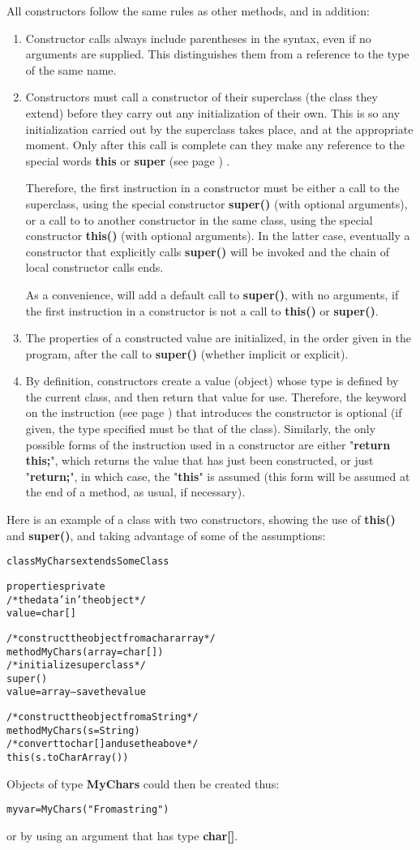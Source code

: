 All constructors follow the same rules as other methods, and in
addition:
\begin{enumerate}
\item Constructor calls always include parentheses in the syntax, even
if no arguments are supplied.  This distinguishes them from a reference
to the type of the same name.
\item Constructors must call a constructor of their superclass (the class
they extend) before they carry out any initialization of their own.
This is so any initialization carried out by the superclass takes
place, and at the appropriate moment.
Only after this call is complete can they make any reference to the
special words  \textbf{this} or \textbf{super} (see page \pageref{refspecial}) .
 
Therefore, the first instruction in a constructor must be either a call
to the superclass, using the special constructor \textbf{super()}
(with optional arguments), or a call to to another constructor in the
same class, using the special constructor \textbf{this()} (with
optional arguments).
In the latter case, eventually a constructor that explicitly
calls \textbf{super()} will be invoked and the chain of local
constructor calls ends.
 
As a convenience, \nr{} will add a default call to \textbf{super()},
with no arguments, if the first instruction in a constructor is not a
call to \textbf{this()} or \textbf{super()}.
\item 
The properties of a constructed value are initialized, in the order
given in the program, after the call to \textbf{super()} (whether
implicit or explicit).
\item 
By definition, constructors create a value (object) whose type is
defined by the current class, and then return that value for use.
Therefore, the  keyword on the
  instruction (see page \pageref{refmethod})  that introduces the
constructor is optional (if given, the type specified must be that of
the class).
Similarly, the only possible forms of the  instruction
used in a constructor are either "\textbf{return this;}", which
returns the value that has just been constructed, or just
"\textbf{return;}", in which case, the "\textbf{this}" is
assumed (this form will be assumed at the end of a method, as usual, if
necessary).
\end{enumerate}
 
Here is an example of a class with two constructors, showing the use
of \textbf{this()} and \textbf{super()}, and taking advantage of
some of the assumptions:
\begin{alltt}
class MyChars extends SomeClass

  properties private
    /* the data 'in' the object */
    value=char[]

  /* construct the object from a char array */
  method MyChars(array=char[])
    /* initialize superclass */
    super()
    value=array             -- save the value

  /* construct the object from a String */
  method MyChars(s=String)
    /* convert to char[] and use the above */
    this(s.toCharArray())
\end{alltt}
 
Objects of type \textbf{MyChars} could then be created thus:
\begin{alltt}
myvar=MyChars("From a string")
\end{alltt}

or by using an argument that has type \textbf{char[]}.
